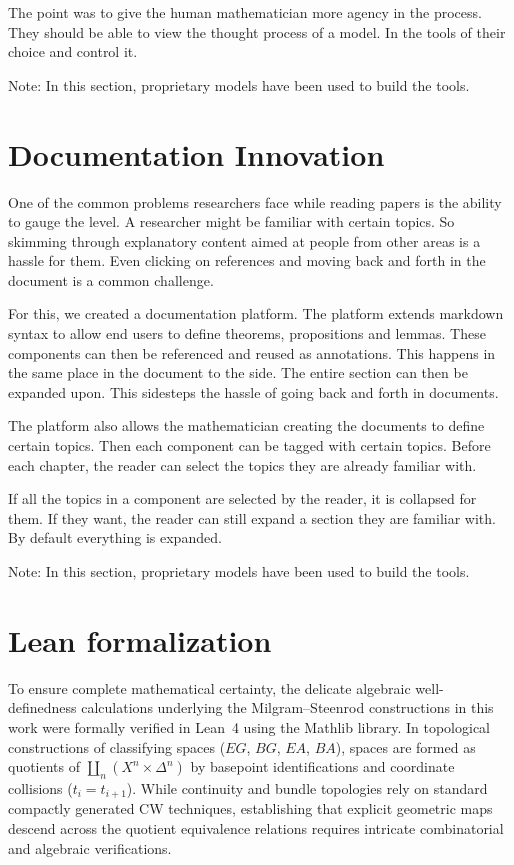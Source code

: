 \documentclass[12 pt]{article}
\theoremstyle{definition}
\begin{document}
The point was to give the human mathematician more agency in the process. They should be able to view the thought process of a model. In the tools of their choice and control it.

Note: In this section, proprietary models have been used to build the tools.

\section{Documentation Innovation}\label{documentation}
One of the common problems researchers face while reading papers is the ability to gauge the level. A researcher might be familiar with certain topics. So skimming through explanatory content aimed at people from other areas is a hassle for them. Even clicking on references and moving back and forth in the document is a common challenge.


For this, we created a documentation platform. The platform extends markdown syntax to allow end users to define theorems, propositions and lemmas. These components can then be referenced and reused as annotations. This happens in the same place in the document to the side. The entire section can then be expanded upon. This sidesteps the hassle of going back and forth in documents.


The platform also allows the mathematician creating the documents to define certain topics. Then each component can be tagged with certain topics. Before each chapter, the reader can select the topics they are already familiar with.



If all the topics in a component are selected by the reader, it is collapsed for them. If they want, the reader can still expand a section they are familiar with. By default everything is expanded.

Note: In this section, proprietary models have been used to build the tools.

\section{Lean formalization}\label{formalization section} %

To ensure complete mathematical certainty, the delicate algebraic well-definedness calculations underlying the Milgram--Steenrod constructions in this work were formally verified in Lean~4 using the Mathlib library. In topological constructions of classifying spaces ($EG$, $BG$, $EA$, $BA$), spaces are formed as quotients of $\coprod_n (X^n \times \Delta^n)$ by basepoint identifications and coordinate collisions ($t_i = t_{i+1}$). While continuity and bundle topologies rely on standard compactly generated CW techniques, establishing that explicit geometric maps descend across the quotient equivalence relations requires intricate combinatorial and algebraic verifications.
\end{document}
